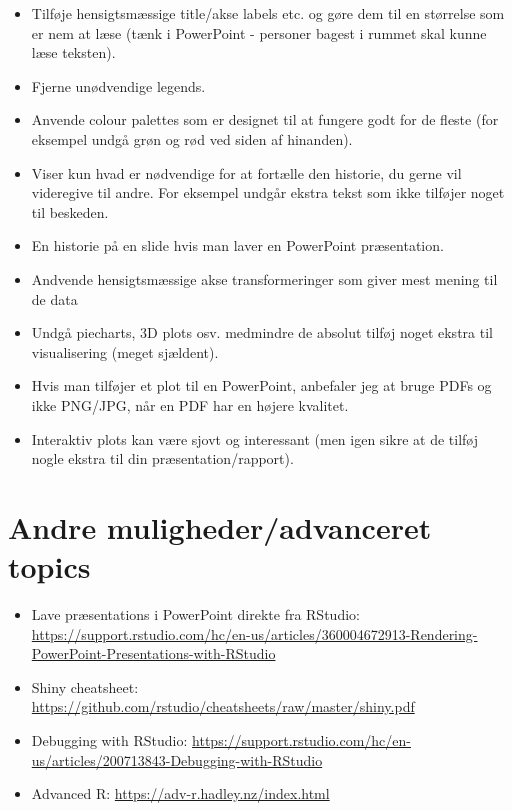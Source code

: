 \documentclass[
]{book}
\providecommand{\tightlist}{%
  \setlength{\itemsep}{0pt}\setlength{\parskip}{0pt}}
\begin{document}
\begin{itemize}
\tightlist
\item
  Tilføje hensigtsmæssige title/akse labels etc. og gøre dem til en størrelse som er nem at læse (tænk i PowerPoint - personer bagest i rummet skal kunne læse teksten).
\item
  Fjerne unødvendige legends.
\item
  Anvende colour palettes som er designet til at fungere godt for de fleste (for eksempel undgå grøn og rød ved siden af hinanden).
\item
  Viser kun hvad er nødvendige for at fortælle den historie, du gerne vil videregive til andre. For eksempel undgår ekstra tekst som ikke tilføjer noget til beskeden.
\item
  En historie på en slide hvis man laver en PowerPoint præsentation.
\item
  Andvende hensigtsmæssige akse transformeringer som giver mest mening til de data
\item
  Undgå piecharts, 3D plots osv. medmindre de absolut tilføj noget ekstra til visualisering (meget sjældent).
\item
  Hvis man tilføjer et plot til en PowerPoint, anbefaler jeg at bruge PDFs og ikke PNG/JPG, når en PDF har en højere kvalitet.
\item
  Interaktiv plots kan være sjovt og interessant (men igen sikre at de tilføj nogle ekstra til din præsentation/rapport).
\end{itemize}

\hypertarget{andre-mulighederadvanceret-topics}{%
\section{Andre muligheder/advanceret topics}\label{andre-mulighederadvanceret-topics}}

\begin{itemize}
\item
  Lave præsentations i PowerPoint direkte fra RStudio: \url{https://support.rstudio.com/hc/en-us/articles/360004672913-Rendering-PowerPoint-Presentations-with-RStudio}
\item
  Shiny cheatsheet: \url{https://github.com/rstudio/cheatsheets/raw/master/shiny.pdf}
\item
  Debugging with RStudio: \url{https://support.rstudio.com/hc/en-us/articles/200713843-Debugging-with-RStudio}
\item
  Advanced R: \url{https://adv-r.hadley.nz/index.html}
\end{itemize}
\end{document}
